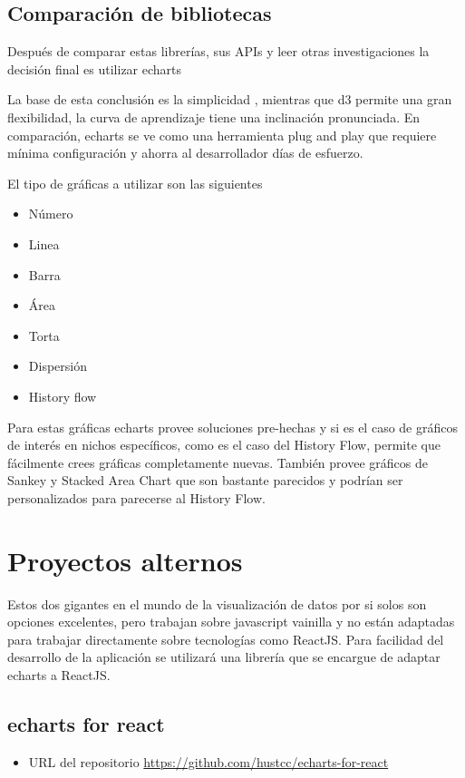 \subsection{ Comparación de bibliotecas }

Después de comparar estas librerías, sus APIs y leer otras investigaciones la decisión final es utilizar echarts

La base de esta conclusión es la simplicidad \cite{EchartsDecision}, mientras que d3 permite una gran flexibilidad, la curva de aprendizaje tiene una inclinación pronunciada. 
En comparación, echarts se ve como una herramienta plug and play que requiere mínima configuración y ahorra al desarrollador días de esfuerzo.

El tipo de gráficas a utilizar son las siguientes
\begin{itemize}    
    \item Número
    \item Linea
    \item Barra
    \item Área
    \item Torta
    \item Dispersión
    \item History flow
\end{itemize}

Para estas gráficas echarts provee soluciones pre-hechas y si es el caso de gráficos de interés en nichos específicos, como es el caso del History Flow, permite que fácilmente crees gráficas completamente nuevas. 
También provee gráficos de Sankey y Stacked Area Chart que son bastante parecidos y podrían ser personalizados para parecerse al History Flow. 

\section{ Proyectos alternos }
Estos dos gigantes en el mundo de la visualización de datos por si solos son opciones excelentes, pero trabajan sobre javascript vainilla y no están adaptadas para trabajar directamente sobre tecnologías como ReactJS. 
Para facilidad del desarrollo de la aplicación se utilizará una librería que se encargue de adaptar echarts a ReactJS.

\subsection{ echarts for react }
\begin{itemize}
    \item URL del repositorio \href{https://github.com/hustcc/echarts-for-react}{https://github.com/hustcc/echarts-for-react}
\end{itemize}